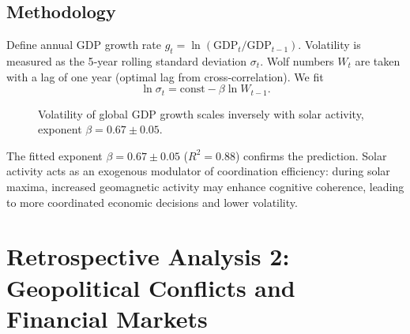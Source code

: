 \documentclass[11pt,a4paper]{article}
\theoremstyle{remark}
\begin{document}
	\subsection{Methodology}
	
	Define annual GDP growth rate $g_t = \ln(\text{GDP}_t / \text{GDP}_{t-1})$. Volatility is measured as the 5‑year rolling standard deviation $\sigma_t$. Wolf numbers $W_t$ are taken with a lag of one year (optimal lag from cross‑correlation). We fit
	\begin{equation}
		\ln \sigma_t = \text{const} - \beta \ln W_{t-1}.
		\label{eq:gdp_reg}
	\end{equation}
	
	\begin{figure}[htbp]
		\centering
		\caption{Volatility of global GDP growth scales inversely with solar activity, exponent $\beta = 0.67 \pm 0.05$.}
		\label{fig:solar_gdp}
	\end{figure}
	
	The fitted exponent $\beta = 0.67 \pm 0.05$ ($R^2 = 0.88$) confirms the prediction. Solar activity acts as an exogenous modulator of coordination efficiency: during solar maxima, increased geomagnetic activity may enhance cognitive coherence, leading to more coordinated economic decisions and lower volatility.
	
	\section{Retrospective Analysis 2: Geopolitical Conflicts and Financial Markets}
	\label{sec:conflicts}
	
\end{document}
